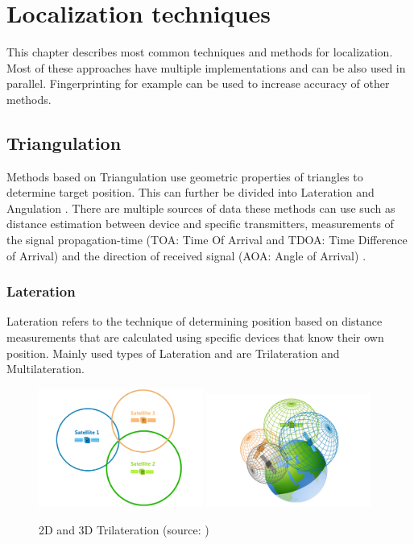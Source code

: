 \chapter{Localization techniques}\label{sec:LocalizationTechniques}
This chapter describes most common techniques and methods for localization. Most of these approaches have multiple implementations and can be also used in parallel. Fingerprinting for example can be used to increase accuracy of other methods.

\section{Triangulation}\label{sec:Triangulation}
Methods based on Triangulation use geometric properties of triangles to determine target position. This can further be divided into Lateration and Angulation \cite{RAinWILTaS}. There are multiple sources of data these methods can use such as distance estimation between device and specific transmitters, measurements of the signal propagation-time (TOA: Time Of Arrival and TDOA: Time Difference of Arrival\cite{LTinWSN}) and the direction of received
signal (AOA: Angle of Arrival\cite{AoALforWSN}) \cite{IILUBLEB}.

\subsection{Lateration}\label{sec:Lateration}
Lateration refers to the technique of determining position based on distance measurements that are calculated using specific devices that know their own position.  Mainly used types of Lateration and are Trilateration and Multilateration. 

\begin{figure}[h!]
	\begin{centering}
		\includegraphics[width=0.48\textwidth]{img/trilateration_2d}
		\includegraphics[width=0.48\textwidth]{img/trilateration_3d}
		\par\end{centering}
	\caption{2D and 3D Trilateration (source: \cite{TvTHGPSRW})\label{fig:2d_and_3d_trilateration}}
	\label{fig2}
\end{figure}


